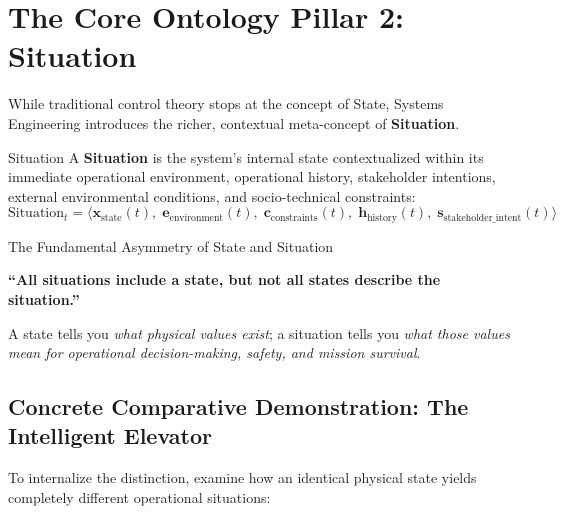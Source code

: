\section{The Core Ontology Pillar 2: Situation}
\label{sec:ontology_situation}

While traditional control theory stops at the concept of State, Systems Engineering introduces the richer, contextual meta-concept of \textbf{Situation}.

\begin{definitionbox}{Situation}
A \textbf{Situation} is the system's internal state contextualized within its immediate operational environment, operational history, stakeholder intentions, external environmental conditions, and socio-technical constraints:
\begin{equation}
    \text{Situation}_t = \Big\langle \mathbf{x}_{\text{state}}(t), \; \mathbf{e}_{\text{environment}}(t), \; \mathbf{c}_{\text{constraints}}(t), \; \mathbf{h}_{\text{history}}(t), \; \mathbf{s}_{\text{stakeholder\_intent}}(t) \Big\rangle
\end{equation}
\end{definitionbox}

\begin{takeawaybox}{The Fundamental Asymmetry of State and Situation}
\begin{center}
\textbf{\large ``All situations include a state, but not all states describe the situation.''}
\end{center}
A state tells you \textit{what physical values exist}; a situation tells you \textit{what those values mean for operational decision-making, safety, and mission survival}.
\end{takeawaybox}

\subsection{Concrete Comparative Demonstration: The Intelligent Elevator}
To internalize the distinction, examine how an identical physical state yields completely different operational situations:

